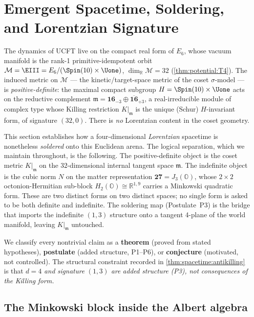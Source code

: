 \section{Emergent Spacetime, Soldering, and Lorentzian Signature}
\label{sec:spacetime:main}

The dynamics of UCFT live on the compact real form of $E_6$, whose vacuum
manifold is the rank-1 primitive-idempotent orbit
$\mathcal M = \EIII = E_6/(\Spin(10)\times\Uone)$, $\dim_{\mathbb R}\mathcal M = 32$
(\autoref{thm:potential:T4}). The induced metric on $\mathcal M$ --- the
kinetic/target-space metric of the coset $\sigma$-model --- is
\emph{positive-definite}: the maximal compact subgroup
$H = \Spin(10)\times\Uone$ acts on the reductive complement
$\mathfrak m = \mathbf{16}_{-3}\oplus\overline{\mathbf{16}}_{+3}$, a real-irreducible
module of complex type whose Killing restriction $K|_{\mathfrak m}$ is the unique
(Schur) $H$-invariant form, of signature $(32,0)$. There is \emph{no} Lorentzian
content in the coset geometry.

This section establishes how a four-dimensional \emph{Lorentzian} spacetime is
nonetheless \emph{soldered} onto this Euclidean arena. The logical separation, which
we maintain throughout, is the following. The positive-definite object is the coset
metric $K|_{\mathfrak m}$ on the $32$-dimensional internal tangent space $\mathfrak m$.
The indefinite object is the cubic norm $N$ on the matter representation
$\mathbf{27}=J_3(\mathbb O)$, whose $2\times2$ octonion-Hermitian sub-block
$H_2(\mathbb O)\cong\mathbb R^{1,9}$ carries a Minkowski quadratic form. These are
two distinct forms on two distinct spaces; no single form is asked to be both
definite and indefinite. The soldering map (Postulate~P3) is the bridge that imports
the indefinite $(1,3)$ structure onto a tangent 4-plane of the world manifold,
leaving $K|_{\mathfrak m}$ untouched.

We classify every nontrivial claim as a \textbf{theorem} (proved from stated
hypotheses), \textbf{postulate} (added structure, P1--P6), or
\textbf{conjecture} (motivated, not controlled). The structural constraint
recorded in \autoref{thm:spacetime:antikilling} is that \emph{$d=4$ and signature
$(1,3)$ are added structure (P3), not consequences of the Killing form.}

\subsection{The Minkowski block inside the Albert algebra}
\label{sec:spacetime:block}

